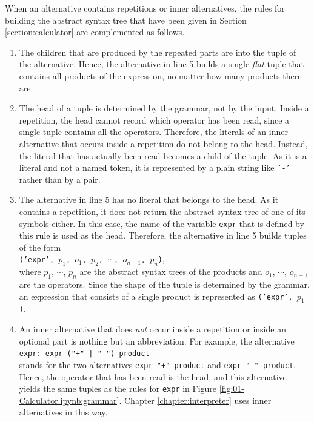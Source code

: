 When an alternative contains repetitions or inner alternatives, the rules for building the abstract syntax
tree that have been given in Section \ref{section:calculator} are complemented as follows.
\begin{enumerate}
\item The children that are produced by the repeated parts are 
      into the tuple of the alternative.  Hence, the alternative in line 5 builds a single \emph{flat} tuple
      that contains all products of the expression, no matter how many products there are.
\item The head of a tuple is determined by the grammar, not by the input.  Inside a repetition, the head
      cannot record which operator has been read, since a single tuple contains all the operators.
      Therefore, the literals of an inner alternative that occurs inside a repetition do not belong to the
      head.  Instead, the literal that has actually been read becomes a child of the tuple.  As it is a literal
      and not a named token, it is represented by a plain string like \texttt{'-'} rather than by a pair.
\item The alternative in line 5 has no literal that belongs to the head.  As it contains a repetition, it does
      not return the abstract syntax tree of one of its symbols either.  In this case, the name of the variable
      \texttt{expr} that is defined by this rule is used as the head.  Therefore, the alternative in line 5 builds tuples of the form
      \\[0.2cm]
      \hspace*{1.3cm}
      \texttt{('expr', $p_1$, $o_1$, $p_2$, $\cdots$, $o_{n-1}$, $p_n$)},
      \\[0.2cm]
      where $p_1$, $\cdots$, $p_n$ are the abstract syntax trees of the products and $o_1$, $\cdots$,
      $o_{n-1}$ are the operators.  Since the shape of the tuple is determined by the grammar, an expression
      that consists of a single product is represented as \texttt{('expr', $p_1$)}.
\item An inner alternative that does \emph{not} occur inside a repetition or inside an optional part is
      nothing but an abbreviation.  For example, the alternative
      \\[0.2cm]
      \hspace*{1.3cm}
      \verb!expr: expr ("+" | "-") product!
      \\[0.2cm]
      stands for the two alternatives \texttt{expr "+" product} and \texttt{expr "-" product}.  Hence, the
      operator that has been read is the head, and this alternative yields the same tuples as the rules for
      \texttt{expr} in Figure \ref{fig:01-Calculator.ipynb:grammar}.  Chapter \ref{chapter:interpreter} uses
      inner alternatives in this way.
\end{enumerate}

